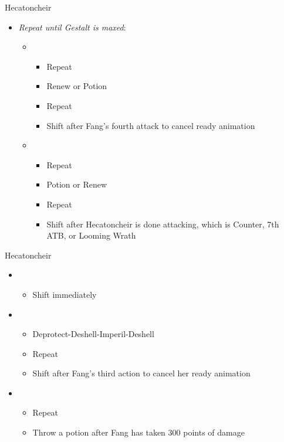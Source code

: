 \begin{paracol}{2}
\begin{battle}{Hecatoncheir}
\begin{itemize}
			\item \textit{Repeat until Gestalt is maxed}:
			      \begin{itemize}
				      \item \third
				            \begin{itemize}
					            \item Repeat
					            \item Renew or Potion
					            \item Repeat
					            \item Shift after Fang's fourth attack to cancel ready animation
				            \end{itemize}
				      \item \fourth
				            \begin{itemize}
					            \item Repeat
					            \item Potion or Renew
					            \item Repeat
					            \item Shift after Hecatoncheir is done attacking, which is Counter, 7th ATB, or Looming Wrath
				            \end{itemize}
			      \end{itemize}
		\end{itemize}
	\end{battle}
	\switchcolumn
	\begin{battle}{Hecatoncheir}
		\begin{itemize}
			\item \first
			      \begin{itemize}
				      \item Shift immediately
			      \end{itemize}
			\item \third
			      \begin{itemize}
				      \item Deprotect-Deshell-Imperil-Deshell
				      \item Repeat
				      \item Shift after Fang's third action to cancel her ready animation
			      \end{itemize}
			\item \fourth
			      \begin{itemize}
				      \item Repeat
				      \item Throw a potion after Fang has taken 300 points of damage

\end{itemize}
\end{itemize}
\end{battle}
\end{paracol}
